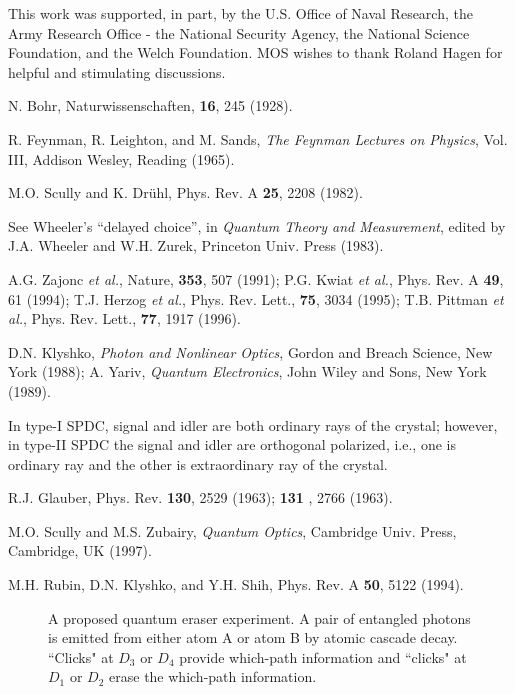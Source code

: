 \documentclass[pra,aps,epsf,12pt]{revtex4-2}
\begin{document}
This work was supported, in part, by the U.S. Office of Naval Research, the Army Research
Office - the National Security Agency, the National Science Foundation, and the Welch
Foundation. MOS wishes to thank Roland Hagen for helpful and stimulating discussions.

\begin{references}
  N. Bohr, Naturwissenschaften, {\bf 16}, 245 (1928).

  R. Feynman, R. Leighton, and M. Sands, {\em The Feynman
Lectures on Physics}, Vol. III, Addison Wesley, Reading (1965).

  M.O. Scully and K. Dr\"{u}hl, Phys. Rev. A {\bf 25}, 2208
(1982).

  See Wheeler's ``delayed choice'', in {\em Quantum Theory
and Measurement}, edited by J.A. Wheeler and W.H. Zurek, Princeton Univ. Press (1983).

  A.G. Zajonc {\em et al.}, Nature, {\bf 353}, 507 (1991);
P.G. Kwiat {\em et al.}, Phys. Rev. A {\bf 49}, 61 (1994); T.J. Herzog {\em et al.},
Phys. Rev. Lett., {\bf 75}, 3034 (1995); T.B. Pittman {\em et al.}, Phys. Rev. Lett.,
{\bf 77}, 1917 (1996).

  D.N. Klyshko, {\em Photon and Nonlinear Optics}, Gordon and
Breach Science, New York (1988); A. Yariv, {\em Quantum Electronics}, John Wiley and
Sons, New York (1989).

  In type-I SPDC, signal and idler are both ordinary rays of
the crystal; however, in type-II SPDC the
signal and idler are orthogonal polarized, i.e., one is ordinary
ray and the other is extraordinary ray of the crystal.

  R.J. Glauber, Phys. Rev. {\bf 130}, 2529 (1963); {\bf 131}%
, 2766 (1963).

  M.O. Scully and M.S. Zubairy, {\em Quantum Optics}, Cambridge
Univ. Press, Cambridge, UK (1997).

  M.H. Rubin, D.N. Klyshko, and Y.H. Shih, Phys. Rev. A {\bf 50}, 5122 (1994).

\end{references}

\newpage

\begin{figure}[tbp]
\centerline{\epsfxsize=2.7in } \caption{A proposed quantum eraser
experiment. A pair of entangled photons is emitted from either atom A or atom B by atomic
cascade decay. ``Clicks" at $D_{3}$ or $D_{4}$ provide which-path information and
``clicks" at $D_{1}$ or $D_{2}$ erase the which-path information.}\label{fig:figure1}
\end{figure}
\end{document}
